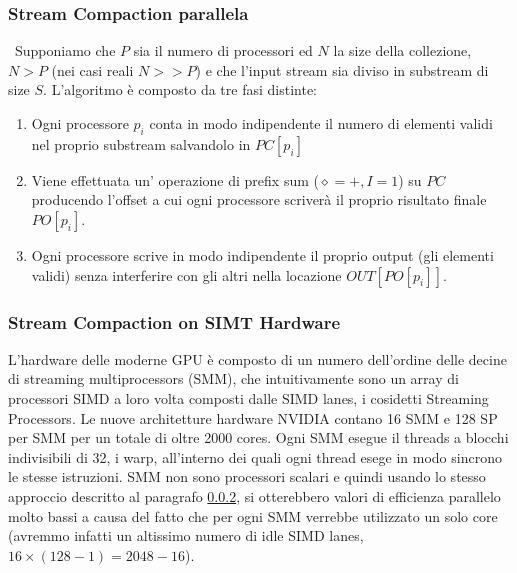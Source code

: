 \documentclass[a4paper]{article}
\begin{document}
  	\subsubsection{Stream Compaction parallela}\
  		Supponiamo che $P$ sia il numero di processori ed $N$ la size della
  		collezione, $N>P$ (nei casi reali $N>>P$) e che l'input stream
  		sia diviso in substream di size $S$.
  		L'algoritmo è composto da tre fasi distinte:
  		\begin{enumerate}
  		  \item Ogni processore $p_i$ conta in modo indipendente il numero di
  		  elementi validi nel proprio substream salvandolo in $PC[p_i]$
  		  \item Viene effettuata un' operazione di prefix sum ($\diamond = +, I=1$)
  		  su $PC$ producendo l'offset a cui ogni processore scriverà il proprio
  		  risultato finale $PO[p_i]$.
  		  \item Ogni processore scrive in modo indipendente il proprio output (gli
  		  elementi validi) senza interferire con gli altri nella locazione
  		  $OUT[PO[p_i]]$.
  		\end{enumerate}
 
 
  \subsubsection{Stream Compaction on SIMT Hardware}\label{smparallel}
  L'hardware  delle moderne GPU è composto di un numero dell'ordine delle decine
  di streaming multiprocessors (SMM), che intuitivamente sono un array di processori SIMD a
  loro volta composti dalle SIMD lanes, i cosidetti Streaming Processors. Le
  nuove architetture hardware NVIDIA contano 16 SMM e 128 SP per SMM per un
  totale di oltre 2000 cores.
  Ogni SMM esegue il threads a blocchi indivisibili di 32, i warp, all'interno
  dei quali ogni thread esege in modo sincrono le stesse istruzioni. SMM non
  sono processori scalari e quindi usando lo stesso approccio descritto al
  paragrafo \ref{smparallel}, si otterebbero valori di efficienza parallelo
  molto bassi a causa del fatto che per ogni SMM verrebbe utilizzato un solo
  core (avremmo infatti un altissimo numero di idle SIMD
  lanes,$16\times(128−1)=2048−16$).
  
\end{document}
